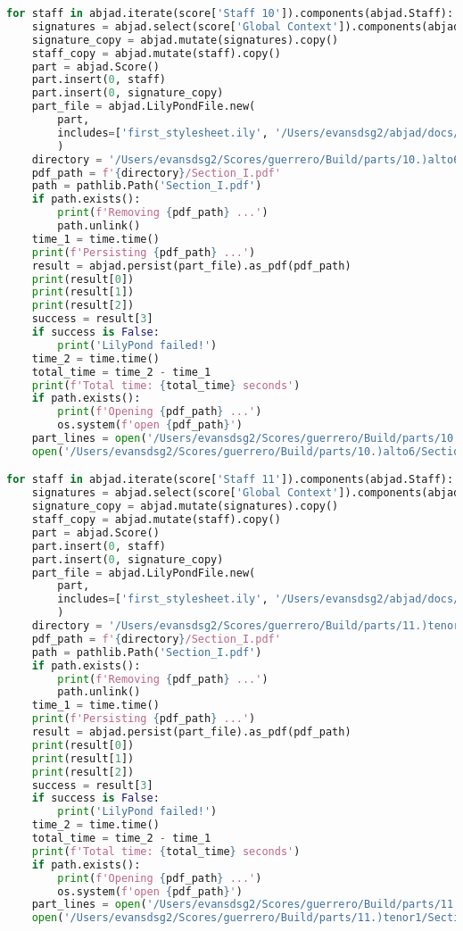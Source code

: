 \begin{lstlisting}[language=Python, caption=Invocation Source Code]
for staff in abjad.iterate(score['Staff 10']).components(abjad.Staff):
    signatures = abjad.select(score['Global Context']).components(abjad.Staff)
    signature_copy = abjad.mutate(signatures).copy()
    staff_copy = abjad.mutate(staff).copy()
    part = abjad.Score()
    part.insert(0, staff)
    part.insert(0, signature_copy)
    part_file = abjad.LilyPondFile.new(
        part,
        includes=['first_stylesheet.ily', '/Users/evansdsg2/abjad/docs/source/_stylesheets/abjad.ily'],
        )
    directory = '/Users/evansdsg2/Scores/guerrero/Build/parts/10.)alto6'
    pdf_path = f'{directory}/Section_I.pdf'
    path = pathlib.Path('Section_I.pdf')
    if path.exists():
        print(f'Removing {pdf_path} ...')
        path.unlink()
    time_1 = time.time()
    print(f'Persisting {pdf_path} ...')
    result = abjad.persist(part_file).as_pdf(pdf_path)
    print(result[0])
    print(result[1])
    print(result[2])
    success = result[3]
    if success is False:
        print('LilyPond failed!')
    time_2 = time.time()
    total_time = time_2 - time_1
    print(f'Total time: {total_time} seconds')
    if path.exists():
        print(f'Opening {pdf_path} ...')
        os.system(f'open {pdf_path}')
    part_lines = open('/Users/evansdsg2/Scores/guerrero/Build/parts/10.)alto6/Section_I.ly').readlines()
    open('/Users/evansdsg2/Scores/guerrero/Build/parts/10.)alto6/Section_I.ly', 'w').writelines(part_lines[15:-1])

for staff in abjad.iterate(score['Staff 11']).components(abjad.Staff):
    signatures = abjad.select(score['Global Context']).components(abjad.Staff)
    signature_copy = abjad.mutate(signatures).copy()
    staff_copy = abjad.mutate(staff).copy()
    part = abjad.Score()
    part.insert(0, staff)
    part.insert(0, signature_copy)
    part_file = abjad.LilyPondFile.new(
        part,
        includes=['first_stylesheet.ily', '/Users/evansdsg2/abjad/docs/source/_stylesheets/abjad.ily'],
        )
    directory = '/Users/evansdsg2/Scores/guerrero/Build/parts/11.)tenor1'
    pdf_path = f'{directory}/Section_I.pdf'
    path = pathlib.Path('Section_I.pdf')
    if path.exists():
        print(f'Removing {pdf_path} ...')
        path.unlink()
    time_1 = time.time()
    print(f'Persisting {pdf_path} ...')
    result = abjad.persist(part_file).as_pdf(pdf_path)
    print(result[0])
    print(result[1])
    print(result[2])
    success = result[3]
    if success is False:
        print('LilyPond failed!')
    time_2 = time.time()
    total_time = time_2 - time_1
    print(f'Total time: {total_time} seconds')
    if path.exists():
        print(f'Opening {pdf_path} ...')
        os.system(f'open {pdf_path}')
    part_lines = open('/Users/evansdsg2/Scores/guerrero/Build/parts/11.)tenor1/Section_I.ly').readlines()
    open('/Users/evansdsg2/Scores/guerrero/Build/parts/11.)tenor1/Section_I.ly', 'w').writelines(part_lines[15:-1])


\end{lstlisting}
